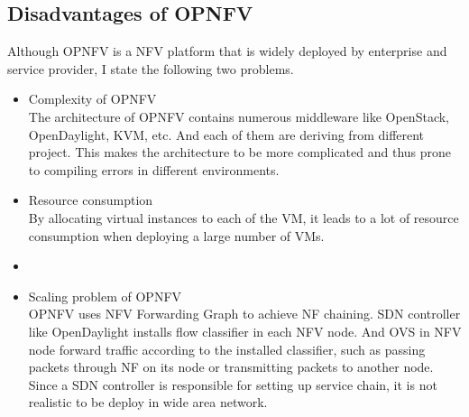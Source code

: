 \subsection{Disadvantages of OPNFV}
Although OPNFV is a NFV platform that is widely deployed by enterprise and service provider, I state the following two problems.
\begin{itemize}
	\item Complexity of OPNFV \\
		The architecture of OPNFV contains numerous middleware like OpenStack, OpenDaylight, KVM, etc. And each of them are deriving from different project. This makes the architecture to be more complicated and thus prone to compiling errors in different environments. 
	\item Resource consumption \\
		By allocating virtual instances to each of the VM, it leads to a lot of resource consumption when deploying a large number of VMs. 
	\item 
	\item Scaling problem of OPNFV \\
		OPNFV uses NFV Forwarding Graph to achieve NF chaining. SDN controller like OpenDaylight installs flow classifier in each NFV node. And OVS in NFV node forward traffic according to the installed classifier, such as passing packets through NF on its node or transmitting packets to another node. Since a SDN controller is responsible for setting up service chain, it is not realistic to be deploy in wide area network.
\end{itemize}



